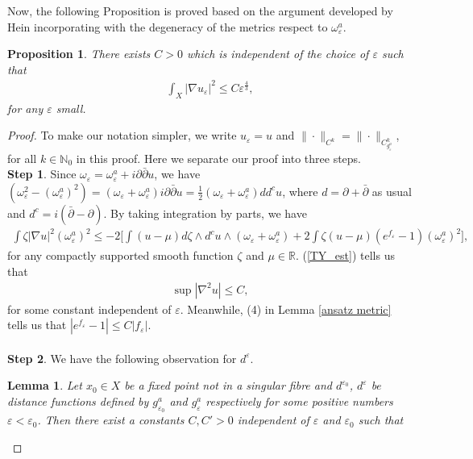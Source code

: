 \documentclass[11pt]{amsart}
\theoremstyle{plain}
\newtheorem{prop}[thm]{Proposition}
\newtheorem{lem}[thm]{Lemma}
\theoremstyle{definition}
\numberwithin{equation}{section}
\renewcommand{\leq}{\leqslant}
\renewcommand{\epsilon}{\varepsilon}
\begin{document}
Now, the following Proposition is proved based on the argument developed by Hein \cite[Proposition 2.9]{Hein} incorporating with the degeneracy of the metrics respect to $\omega^a_\epsilon$.
\begin{prop}\label{lema_Hein}
There exists $C>0$ which is independent of the choice of $\varepsilon$ such that
\begin{align}
\int_{X}|\nabla u_{\varepsilon}|^2\leq C\varepsilon^{\frac{4}{3}},
\end{align}
for any $\varepsilon$ small.
\end{prop}
\begin{proof}To make our notation simpler, we write $u_{\varepsilon}=u$ and $\|\cdot\|_{C^k}=\|\cdot\|_{C^k_{g^a_{\varepsilon}}}$, for all $k\in\mathbb{N}_0$ in this proof.
Here we separate our proof into three steps.\\
{\bf Step 1}. 
Since $\omega_{\varepsilon}=\omega^a_{\varepsilon}+i\partial\bar{\partial}u$, we have  $(\omega_{\varepsilon}^2-(\omega^a_{\varepsilon})^2)=(\omega_{\varepsilon}+\omega^a_{\varepsilon})i\partial\bar{\partial}u=\frac{1}{2}(\omega_{\varepsilon}+\omega^a_{\varepsilon})dd^cu$, where $d=\partial+\bar{\partial}$ as usual and $d^c=i(\bar{\partial}-\partial)$. By taking integration by parts, we have
\begin{align}\label{ineq_1}
\int \zeta |\nabla u|^2(\omega^a_{\varepsilon})^2\leq -2\Big[\int (u-\mu)d\zeta\wedge d^cu\wedge (\omega_{\varepsilon}+\omega^a_{\varepsilon})+2\int\zeta(u-\mu)(e^{f_{\varepsilon}}-1)(\omega^a_{\varepsilon})^2\Big], 
\end{align}
for any compactly supported smooth function $\zeta$ and $\mu\in\mathbb{R}$. (\ref{TY_est}) tells us that
\begin{align}\label{TY}
\sup |\nabla^2u|\leq C,
\end{align}
for some constant independent of $\varepsilon$. Meanwhile, (4) in Lemma \ref{ansatz metric} tells us that $|e^{f_{\varepsilon}}-1|\leq C|f_{\varepsilon}|$.\\
\ \\
{\bf Step 2}. We have the following observation for $d^{\varepsilon}$.
\begin{lem}\label{d1_and_de}
	Let $x_0\in X$ be a fixed point not in a singular fibre and $d^{\varepsilon_0}$, $d^{\varepsilon}$ be distance functions defined by $g^a_{\varepsilon_0}$ and $g^a_{\varepsilon}$ respectively for some positive numbers $\varepsilon<\varepsilon_0$. Then there exist a constants $C,C'>0$ independent of $\varepsilon$ and $\varepsilon_0$ such that 

\end{lem}
\end{proof}
\end{document}
